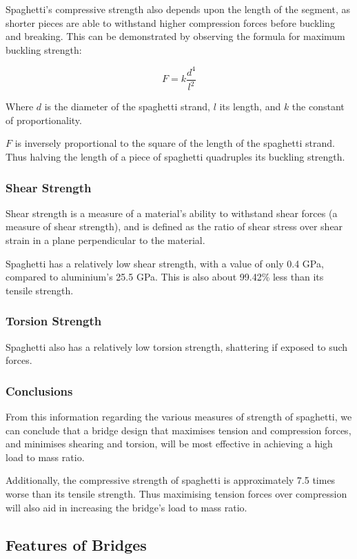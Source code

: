 \documentclass[a4paper,11pt]{article}
\begin{document}
Spaghetti's compressive strength also depends upon the length of the segment, as
shorter pieces are able to withstand higher compression forces before buckling
and breaking.
This can be demonstrated by observing the formula for maximum buckling strength:

$$
F = k \frac{d^4}{l^2}
$$

Where $d$ is the diameter of the spaghetti strand, $l$ its length, and $k$ the
constant of proportionality.

$F$ is inversely proportional to the square of the length of the spaghetti
strand.
Thus halving the length of a piece of spaghetti quadruples its buckling
strength.


\subsubsection{Shear Strength}

Shear strength is a measure of a material's ability to withstand shear forces (a
measure of shear strength), and is defined as the ratio of shear stress over
shear strain in a plane perpendicular to the material.

Spaghetti has a relatively low shear strength, with a value of only 0.4 GPa,
compared to aluminium's 25.5 GPa.
This is also about 99.42\% less than its tensile strength.


\subsubsection{Torsion Strength}

Spaghetti also has a relatively low torsion strength, shattering if exposed to
such forces.


\subsubsection{Conclusions}

From this information regarding the various measures of strength of spaghetti,
we can conclude that a bridge design that maximises tension and compression
forces, and minimises shearing and torsion, will be most effective in achieving
a high load to mass ratio.

Additionally, the compressive strength of spaghetti is approximately 7.5 times
worse than its tensile strength. Thus maximising tension forces over compression
will also aid in increasing the bridge's load to mass ratio.


\subsection{Features of Bridges}
\end{document}

